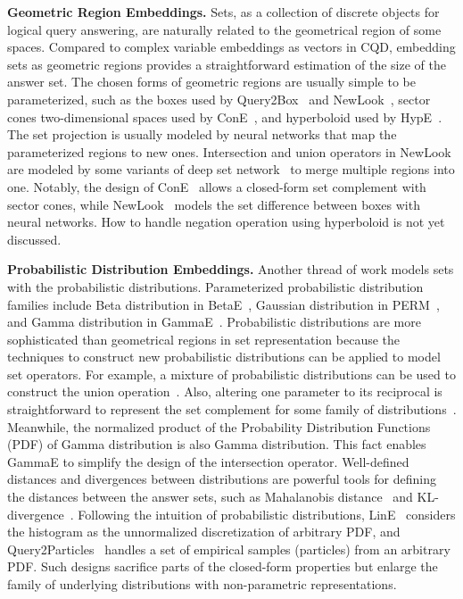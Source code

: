 \documentclass[11pt]{article}
\begin{document}
\noindent\textbf{Geometric Region Embeddings.} Sets, as a collection of discrete objects for logical query answering, are naturally related to the geometrical region of some spaces. Compared to complex variable embeddings as vectors in CQD, embedding sets as geometric regions provides a straightforward estimation of the size of the answer set. The chosen forms of geometric regions are usually simple to be parameterized, such as the boxes used by Query2Box~\cite{Ren2020Query2boxReasoning} and NewLook~\cite{Liu2021NeuralAnsweringLogical}, sector cones two-dimensional spaces used by ConE~\cite{Zhang2021ConECone}, and hyperboloid used by HypE~\cite{Choudhary2021SelfSupervisedHyperboloidc}. The set projection is usually modeled by neural networks that map the parameterized regions to new ones. Intersection and union operators in NewLook are modeled by some variants of deep set network~\cite{Zaheer2017DeepSets} to merge multiple regions into one. Notably, the design of ConE~\cite{Zhang2021ConECone} allows a closed-form set complement with sector cones, while NewLook~\cite{Liu2021NeuralAnsweringLogical} models the set difference between boxes with neural networks. How to handle negation operation using hyperboloid is not yet discussed.

\noindent\textbf{Probabilistic Distribution Embeddings.} Another thread of work models sets with the probabilistic distributions. Parameterized probabilistic distribution families include Beta distribution in BetaE~\cite{Ren2020BetaEmbeddings}, Gaussian distribution in PERM~\cite{Choudhary2021ProbabilisticEntity}, and Gamma distribution in GammaE~\cite{Yang2022GammaEGamma}. Probabilistic distributions are more sophisticated than geometrical regions in set representation because the techniques to construct new probabilistic distributions can be applied to model set operators. For example, a mixture of probabilistic distributions can be used to construct the union operation~\cite{Choudhary2021ProbabilisticEntity,Yang2022GammaEGamma}. Also, altering one parameter to its reciprocal is straightforward to represent the set complement for some family of distributions~\cite{Ren2020BetaEmbeddings,Yang2022GammaEGamma}. Meanwhile, the normalized product of the Probability Distribution Functions (PDF) of Gamma distribution is also Gamma distribution. This fact enables GammaE to simplify the design of the intersection operator. Well-defined distances and divergences between distributions are powerful tools for defining the distances between the answer sets, such as Mahalanobis distance~\cite{Choudhary2021ProbabilisticEntity} and KL-divergence~\cite{Ren2020BetaEmbeddings,Yang2022GammaEGamma}. Following the intuition of probabilistic distributions, LinE~\cite{Huang2022LinELogical} considers the histogram as the unnormalized discretization of arbitrary PDF, and Query2Particles~\cite{Bai2022Query2ParticlesKnowledge} handles a set of empirical samples (particles) from an arbitrary PDF. Such designs sacrifice parts of the closed-form properties but enlarge the family of underlying distributions with non-parametric representations.
\end{document}

